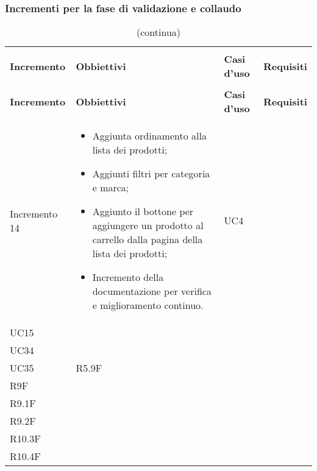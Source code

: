 \subsubsection{Incrementi per la fase di validazione e collaudo}
\renewcommand{\arraystretch}{1.5}
\begin{longtable}{
    >{\centering}p{}
    >{\raggedright}p{}
    >{\centering}p{}
    >{\centering}p{}
    }

    \caption{Tabella di tracciamento per la validazione}                                                                           \\
    \rowcolor{white}                                                                                                               \\
    \rowcolor{logo!70}
    \centering\textbf{Incremento} & \centering\textbf{Obbiettivi}  & \centering\textbf{Casi d'uso}  & \centering\textbf{Requisiti}
    \tabularnewline
    \endfirsthead
    \rowcolor{white}\caption[]{(continua)}                                                                                         \\
    \rowcolor{logo!70}
    \centering\textbf{Incremento} & \centering\textbf{Obbiettivi}  & \centering\textbf{Casi d'uso}  & \centering\textbf{Requisiti}
    \tabularnewline
    \endhead
    Incremento 14                 & \vspace{-15px}
    \begin{itemize}
        \renewcommand\labelitemi{-}
        \item Aggiunta ordinamento alla lista dei prodotti;
        \item Aggiunti filtri per categoria e marca;
        \item Aggiunto il bottone per aggiungere un prodotto al carrello dalla pagina della lista dei prodotti;
        \item Incremento della documentazione per verifica e miglioramento continuo.
    \end{itemize}    & UC4                                                                                            \\ UC15 \\ UC34 \\ UC35  & R5.9F \\ R9F \\ R9.1F \\ R9.2F \\ R10.3F \\ R10.4F

\end{longtable}
